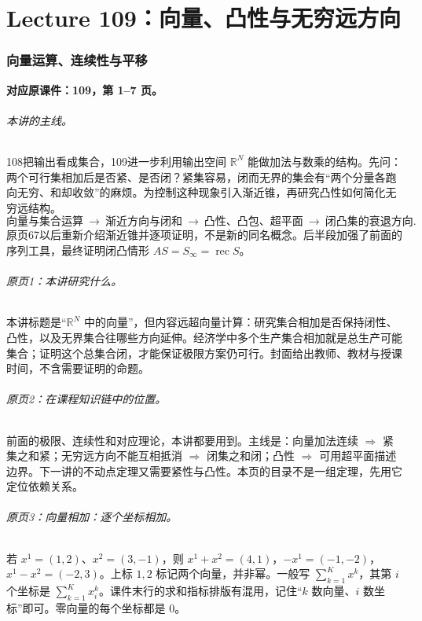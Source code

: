 \documentclass[11pt,a4paper]{article}
\newcommand{\R}{\mathbb{R}}\newcommand{\N}{\mathbb{N}}
\theoremstyle{definition}\newtheorem{definition}{定义}\newtheorem{example}{例}
\begin{document}
\part{Lecture 109：向量、凸性与无穷远方向}
\setcounter{section}{0}

\clearpage\section{向量运算、连续性与平移}\label{g:109:1}

\textbf{对应原课件：109，第 1--7 页。}


\paragraph{本讲的主线。}
108把输出看成集合，109进一步利用输出空间 $\R^N$ 能做加法与数乘的结构。先问：两个可行集相加后是否紧、是否闭？紧集容易，闭而无界的集会有“两个分量各跑向无穷、和却收敛”的麻烦。为控制这种现象引入渐近锥，再研究凸性如何简化无穷远结构。
\[\text{向量与集合运算}\ \longrightarrow\ \text{渐近方向与闭和}
\ \longrightarrow\ \text{凸性、凸包、超平面}\ \longrightarrow\ \text{闭凸集的衰退方向}.\]
原页67以后重新介绍渐近锥并逐项证明，不是新的同名概念。后半段加强了前面的序列工具，最终证明闭凸情形 $AS=S_\infty=\operatorname{rec}S$。


\paragraph{原页1：本讲研究什么。}本讲标题是“$\R^N$ 中的向量”，但内容远超向量计算：研究集合相加是否保持闭性、凸性，以及无界集合往哪些方向延伸。经济学中多个生产集合相加就是总生产可能集合；证明这个总集合闭，才能保证极限方案仍可行。封面给出教师、教材与授课时间，不含需要证明的命题。



\paragraph{原页2：在课程知识链中的位置。}前面的极限、连续性和对应理论，本讲都要用到。主线是：向量加法连续 $\Rightarrow$ 紧集之和紧；无穷远方向不能互相抵消 $\Rightarrow$ 闭集之和闭；凸性 $\Rightarrow$ 可用超平面描述边界。下一讲的不动点定理又需要紧性与凸性。本页的目录不是一组定理，先用它定位依赖关系。



\paragraph{原页3：向量相加：逐个坐标相加。}若 $x^1=(1,2)$、$x^2=(3,-1)$，则 $x^1+x^2=(4,1)$，$-x^1=(-1,-2)$，$x^1-x^2=(-2,3)$。上标 $1,2$ 标记两个向量，并非幂。一般写 $\sum_{k=1}^K x^k$，其第 $i$ 个坐标是 $\sum_{k=1}^K x_i^k$。课件末行的求和指标排版有混用，记住“$k$ 数向量、$i$ 数坐标”即可。零向量的每个坐标都是 $0$。
\end{document}
